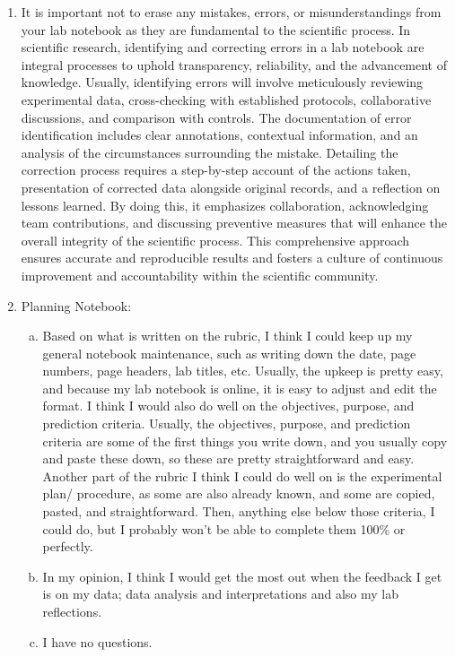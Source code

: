 \documentclass[idxtotoc,hyperref,openany]{labbook} %
\begin{document}
\begin{enumerate}
    \item It is important not to erase any mistakes, errors, or misunderstandings from your lab notebook as they are fundamental to the scientific process. In scientific research, identifying and correcting errors in a lab notebook are integral processes to uphold transparency, reliability, and the advancement of knowledge. Usually, identifying errors will involve meticulously reviewing experimental data, cross-checking with established protocols, collaborative discussions, and comparison with controls. The documentation of error identification includes clear annotations, contextual information, and an analysis of the circumstances surrounding the mistake. Detailing the correction process requires a step-by-step account of the actions taken, presentation of corrected data alongside original records, and a reflection on lessons learned. By doing this, it emphasizes collaboration, acknowledging team contributions, and discussing preventive measures that will enhance the overall integrity of the scientific process. This comprehensive approach ensures accurate and reproducible results and fosters a culture of continuous improvement and accountability within the scientific community.
    \item Planning Notebook:
    \begin{enumerate}[(a)]
        \item Based on what is written on the rubric, I think I could keep up my general notebook maintenance, such as writing down the date, page numbers, page headers, lab titles, etc. Usually, the upkeep is pretty easy, and because my lab notebook is online, it is easy to adjust and edit the format. I think I would also do well on the objectives, purpose, and prediction criteria. Usually, the objectives, purpose, and prediction criteria are some of the first things you write down, and you usually copy and paste these down, so these are pretty straightforward and easy. Another part of the rubric I think I could do well on is the experimental plan/ procedure, as some are also already known, and some are copied, pasted, and straightforward. Then, anything else below those criteria, I could do, but I probably won't be able to complete them 100\% or perfectly.
        \item In my opinion, I think I would get the most out when the feedback I get is on my data; data analysis and interpretations and also my lab reflections.
        \item I have no questions.
    \end{enumerate}
\end{enumerate}
\end{document}
